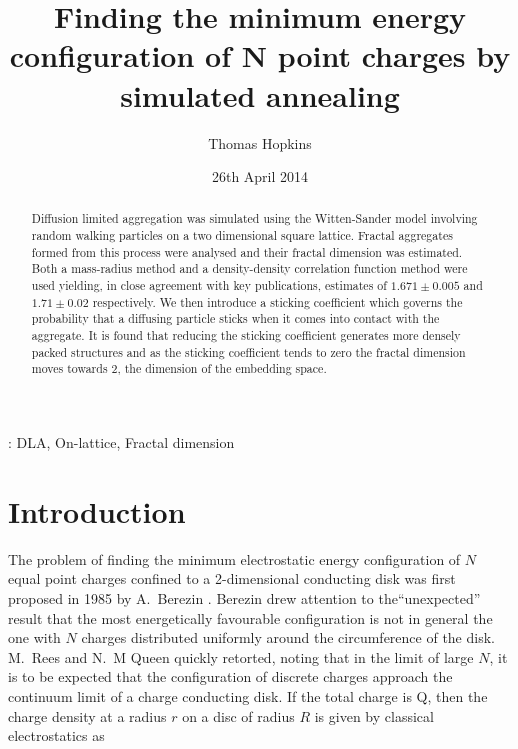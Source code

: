 \documentclass[12pt,a4paper,final]{iopart}
\begin{document}
\title[Finding the minimum energy configuration of N point charges by simulated annealing]{Finding the minimum energy configuration of N point charges by simulated annealing}
\author{Thomas Hopkins}
\address{School of Physics \& Astronomy, University of Southampton}
\date{26th April 2014}


\begin{abstract}
Diffusion limited aggregation was simulated using the Witten-Sander model involving random walking particles on a two dimensional square lattice. Fractal aggregates formed from this process were analysed and their fractal dimension was estimated. Both a mass-radius method and a density-density correlation function method were used yielding, in close agreement with key publications, estimates of $1 .671 \pm 0.005$ and $1.71 \pm  0.02$ respectively.  We then introduce a sticking coefficient which governs the probability that a diffusing particle sticks when it comes into contact with the aggregate. It is found that reducing the sticking coefficient generates more densely packed structures and as the sticking coefficient tends to zero the fractal dimension moves towards 2, the dimension of the embedding space.
\end{abstract}

\vspace{2pc}
: DLA, On-lattice, Fractal dimension



\section{Introduction}
The problem of finding the minimum electrostatic energy configuration of $N$ equal point charges confined to a 2-dimensional conducting disk was first proposed in 1985 by A.~Berezin \cite{berezin85}. Berezin drew attention to the``unexpected” result that the most energetically favourable configuration is not in general the one with $N$ charges distributed uniformly around the circumference of the disk.  M.~Rees \cite{rees85} and N.~M Queen \cite{queen85} quickly retorted, noting that in the limit of large $N$, it is to be expected that the configuration of discrete charges approach the continuum limit of a charge conducting disk. If the total charge is Q, then the charge density at a radius $r$ on a disc of radius $R$ is given by classical electrostatics as 
\end{document}

